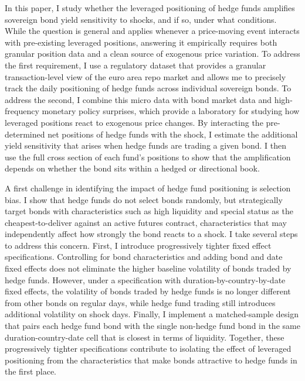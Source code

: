 \documentclass[english, 11pt, oneside]{article}
\begin{document}
In this paper, I study whether the leveraged positioning of hedge funds amplifies sovereign bond yield sensitivity to shocks, and if so, under what conditions. While the question is general and applies whenever a price-moving event interacts with pre-existing leveraged positions, answering it empirically requires both granular position data and a clean source of exogenous price variation. To address the first requirement, I use a regulatory dataset that provides a granular transaction-level view of the euro area repo market and allows me to precisely track the daily positioning of hedge funds across individual sovereign bonds. To address the second, I combine this micro data with bond market data and high-frequency monetary policy surprises, which provide a laboratory for studying how leveraged positions react to exogenous price changes. By interacting the pre-determined net positions of hedge funds with the shock, I estimate the additional yield sensitivity that arises when hedge funds are trading a given bond. I then use the full cross section of each fund's positions to show that the amplification depends on whether the bond sits within a hedged or directional book. 

A first challenge in identifying the impact of hedge fund positioning is selection bias. I show that hedge funds do not select bonds randomly, but strategically target bonds with characteristics such as high liquidity and special status as the cheapest-to-deliver against an active futures contract, characteristics that may independently affect how strongly the bond reacts to a shock. I take several steps to address this concern. First, I introduce progressively tighter fixed effect specifications. Controlling for bond characteristics and adding bond and date fixed effects does not eliminate the higher baseline volatility of bonds traded by hedge funds. However, under a specification with duration-by-country-by-date fixed effects, the volatility of bonds traded by hedge funds is no longer different from other bonds on regular days, while hedge fund trading still introduces additional volatility on shock days. Finally, I implement a matched-sample design that pairs each hedge fund bond with the single non-hedge fund bond in the same duration-country-date cell that is closest in terms of liquidity. Together, these progressively tighter specifications contribute to isolating the effect of leveraged positioning from the characteristics that make bonds attractive to hedge funds in the first place.
\end{document}
